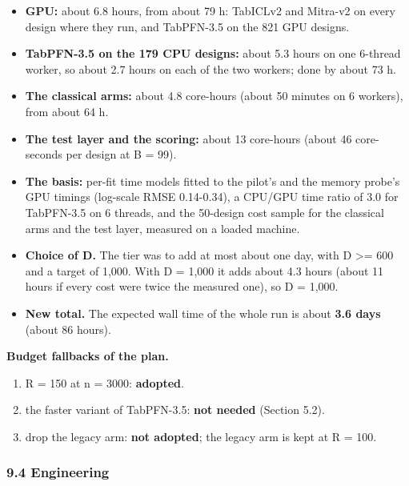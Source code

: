 \documentclass[
  10pt,
]{article}
\providecommand{\tightlist}{%
  \setlength{\itemsep}{0pt}\setlength{\parskip}{0pt}}
\begin{document}
\begin{itemize}
\tightlist
\item
  \textbf{GPU:} about 6.8 hours, from about 79 h: TabICLv2
  and Mitra-v2 on every design where they run, and
  TabPFN-3.5 on the 821 GPU designs.
\item
  \textbf{TabPFN-3.5 on the 179 CPU designs:} about 5.3
  hours on one 6-thread worker, so about 2.7 hours on each
  of the two workers; done by about 73 h.
\item
  \textbf{The classical arms:} about 4.8 core-hours (about
  50 minutes on 6 workers), from about 64 h.
\item
  \textbf{The test layer and the scoring:} about 13
  core-hours (about 46 core-seconds per design at B = 99).
\item
  \textbf{The basis:} per-fit time models fitted to the
  pilot's and the memory probe's GPU timings (log-scale RMSE
  0.14-0.34), a CPU/GPU time ratio of 3.0 for TabPFN-3.5 on
  6 threads, and the 50-design cost sample for the classical
  arms and the test layer, measured on a loaded machine.
\item
  \textbf{Choice of D.} The tier was to add at most about
  one day, with D \textgreater= 600 and a target of 1,000.
  With D = 1,000 it adds about 4.3 hours (about 11 hours if
  every cost were twice the measured one), so D = 1,000.
\item
  \textbf{New total.} The expected wall time of the whole
  run is about \textbf{3.6 days} (about 86 hours).
\end{itemize}

\textbf{Budget fallbacks of the plan.}

\begin{enumerate}
\def\labelenumi{\arabic{enumi}.}
\tightlist
\item
  R = 150 at n = 3000: \textbf{adopted}.
\item
  the faster variant of TabPFN-3.5: \textbf{not needed}
  (Section 5.2).
\item
  drop the legacy arm: \textbf{not adopted}; the legacy arm
  is kept at R = 100.
\end{enumerate}

\subsubsection{9.4 Engineering}\label{engineering}
\end{document}
